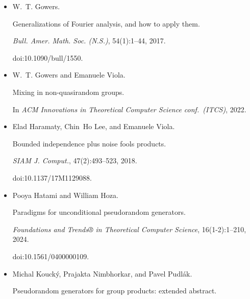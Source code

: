 \begin{itemize}
Pseudorandom generators for combinatorial shapes.


\emph{SIAM J. Comput.}, 42(3):1051–1076, 2013.


doi:10.1137/110854990.





\item[] 
[21]

W. T. Gowers.


Generalizations of Fourier analysis, and how to apply them.


\emph{Bull. Amer. Math. Soc. (N.S.)}, 54(1):1–44, 2017.


doi:10.1090/bull/1550.





\item[] 
[22]

W. T. Gowers and Emanuele Viola.


Mixing in non-quasirandom groups.


In \emph{ACM Innovations in Theoretical Computer Science
conf. (ITCS)}, 2022.





\item[] 
[23]

Elad Haramaty, Chin Ho Lee, and Emanuele Viola.


Bounded independence plus noise fools products.


\emph{SIAM J. Comput.}, 47(2):493–523, 2018.


doi:10.1137/17M1129088.





\item[] 
[24]

Pooya Hatami and William Hoza.


Paradigms for unconditional pseudorandom generators.


\emph{Foundations and Trends® in Theoretical Computer Science},
16(1-2):1–210, 2024.


doi:10.1561/0400000109.





\item[] 
[25]

Michal Koucký, Prajakta Nimbhorkar, and Pavel Pudlák.


Pseudorandom generators for group products: extended abstract.



\end{itemize}
